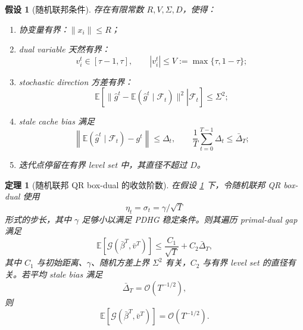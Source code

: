\documentclass[UTF8,a4paper,11pt]{ctexart}
\newtheorem{theorem}{定理}
\newtheorem{assumption}{假设}
\begin{document}
\begin{assumption}[随机联邦条件]
\label{assump:stoch}
存在有限常数 $R,V,\Sigma,D$，使得：
\begin{enumerate}[leftmargin=2em]
    \item 协变量有界：$\|x_i\|\le R$；
    \item dual variable 天然有界：
    \[
        v_i^t\in[\tau-1,\tau],
        \qquad
        |v_i^t|\le V:=\max\{\tau,1-\tau\};
    \]
    \item stochastic direction 方差有界：
    \begin{equation}
        \mathbb{E}
        \left[
        \left.
        \|\widehat{g}^t-\mathbb{E}(\widehat{g}^t\mid\mathcal{F}_t)\|^2
        \right|
        \mathcal{F}_t
        \right]
        \le
        \Sigma^2;
        \label{eq:variance}
    \end{equation}
    \item stale cache bias 满足
    \begin{equation}
        \left\|
        \mathbb{E}(\widehat{g}^t\mid\mathcal{F}_t)-g^t
        \right\|
        \le
        \Delta_t,
        \qquad
        \frac{1}{T}
        \sum_{t=0}^{T-1}
        \Delta_t
        \le
        \bar{\Delta}_T;
        \label{eq:bias}
    \end{equation}
    \item 迭代点停留在有界 level set 中，其直径不超过 $D$。
\end{enumerate}
\end{assumption}

\begin{theorem}[随机联邦 QR box-dual 的收敛阶数]
\label{thm:stoch}
在假设 \ref{assump:stoch} 下，令随机联邦 QR box-dual 使用
\[
    \eta_t=\sigma_t=\gamma/\sqrt{T}
\]
形式的步长，其中 $\gamma$ 足够小以满足 PDHG 稳定条件。则其遍历 primal-dual gap
满足
\begin{equation}
    \mathbb{E}
    \left[
    \mathcal{G}(\bar{\beta}^T,\bar{v}^T)
    \right]
    \le
    \frac{C_1}{\sqrt{T}}
    +
    C_2\bar{\Delta}_T,
    \label{eq:stoch-rate}
\end{equation}
其中 $C_1$ 与初始距离、$\gamma$、随机方差上界 $\Sigma^2$ 有关，$C_2$ 与有界
level set 的直径有关。若平均 stale bias 满足
\[
    \bar{\Delta}_T=\mathcal{O}(T^{-1/2}),
\]
则
\[
    \mathbb{E}
    \left[
    \mathcal{G}(\bar{\beta}^T,\bar{v}^T)
    \right]
    =
    \mathcal{O}(T^{-1/2}).
\]
\end{theorem}
\end{document}
